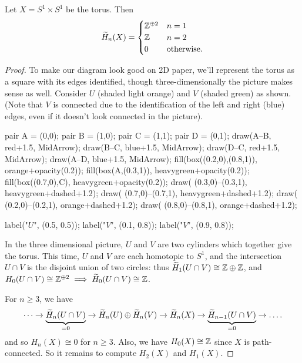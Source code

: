 \begin{proposition}
	\label{prop:homology_torus}
	Let $X = S^1 \times S^1$ be the torus.
	Then
	\[
		\widetilde H_n(X)
		=
		\begin{cases}
			\mathbb Z^{\oplus 2} & n = 1 \\
			\mathbb Z & n = 2 \\
			0 & \text{otherwise}.
		\end{cases}
	\]
\end{proposition}
\begin{proof}
	To make our diagram look good on 2D paper,
	we'll represent the torus as a square with its edges identified,
	though three-dimensionally the picture makes sense as well.
	Consider $U$ (shaded light orange) and $V$ (shaded green) as shown.
	(Note that $V$ is connected due to the identification of the left and right (blue) edges,
	even if it doesn't look connected in the picture).
	\begin{center}
		\begin{asy}
			pair A = (0,0);
			pair B = (1,0);
			pair C = (1,1);
			pair D = (0,1);
			draw(A--B, red+1.5, MidArrow);
			draw(B--C, blue+1.5, MidArrow);
			draw(D--C, red+1.5, MidArrow);
			draw(A--D, blue+1.5, MidArrow);
			fill(box((0.2,0),(0.8,1)), orange+opacity(0.2));
			fill(box(A,(0.3,1)), heavygreen+opacity(0.2));
			fill(box((0.7,0),C), heavygreen+opacity(0.2));
			draw( (0.3,0)--(0.3,1), heavygreen+dashed+1.2);
			draw( (0.7,0)--(0.7,1), heavygreen+dashed+1.2);
			draw( (0.2,0)--(0.2,1), orange+dashed+1.2);
			draw( (0.8,0)--(0.8,1), orange+dashed+1.2);

			label("$U$", (0.5, 0.5));
			label("$V$", (0.1, 0.8));
			label("$V$", (0.9, 0.8));
		\end{asy}
	\end{center}
	In the three dimensional picture, $U$ and $V$ are two cylinders which together give the torus.
	This time, $U$ and $V$ are each homotopic to $S^1$, and the intersection $U \cap V$
	is the disjoint union of two circles: thus $\widetilde H_1(U \cap V) \cong \mathbb Z \oplus \mathbb Z$,
	and $H_0(U \cap V) \cong \mathbb Z^{\oplus 2} \implies \widetilde H_0(U \cap V) \cong \mathbb Z$.

	For $n \ge 3$, we have
	\[
		\dots \to
		\underbrace{\widetilde H_n(U \cap V)}_{=0}
		\to \widetilde H_n(U) \oplus \widetilde H_n(V) \to \widetilde H_n(X) \to
		\underbrace{\widetilde H_{n-1}(U \cap V)}_{=0} \to \dots.
	\]
	and so $H_n(X) \cong 0$ for $n \ge 3$.
	Also, we have $H_0(X) \cong \mathbb Z$ since $X$ is path-connected.
	So it remains to compute $H_2(X)$ and $H_1(X)$.


\end{proof}
